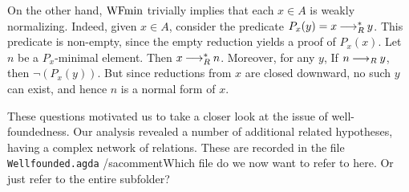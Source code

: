 On the other hand, $\mathrm{WFmin}$ trivially implies that each $x \in A$ is weakly normalizing.
Indeed, given $x \in A$, consider the predicate $P_x(y) = x \mathbin{\longrightarrow_R^*} y$.
This predicate is non-empty, since the empty reduction yields a proof of $P_x(x)$.
Let $n$ be a $P_x$-minimal element.  Then $x \mathbin{\longrightarrow_R^*} n$.  Moreover, for any $y$,
If $n \mathbin{\longrightarrow_R} y$, then $\lnot(P_x(y))$.  But since reductions from $x$ are closed downward,
no such $y$ can exist, and hence $n$ is a normal form of $x$.

%
These questions motivated us to take a closer look at the issue of well-foundedness.
Our analysis revealed a number of additional related hypotheses, having a complex
network of relations.  %
These are recorded in the file \verb|Wellfounded.agda| /sacomment{Which file do we now want to refer to here. Or just refer to the entire subfolder?}


%
%
